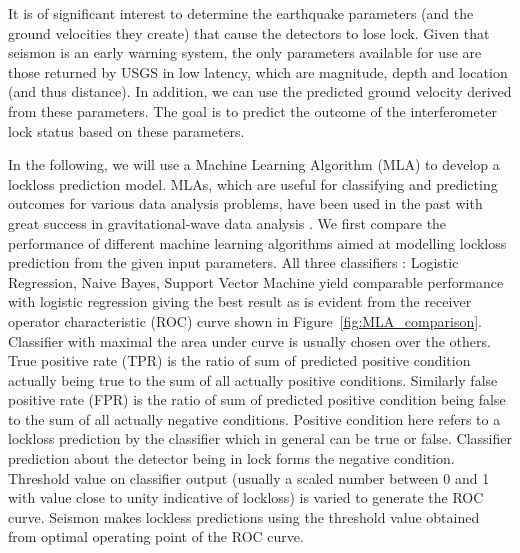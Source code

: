 \documentclass[reprint, prl, aps, showpacs]{revtex4-1}
\newcommand{\seismon}{\textnormal{seismon }}
\begin{document}

It is of significant interest to determine the earthquake parameters (and the ground velocities they create) that cause the detectors to lose lock.
Given that \seismon is an early warning system, the only parameters available for use are those returned by USGS in low latency, which are magnitude, depth and location (and thus distance). 
In addition, we can use the predicted ground velocity derived from these parameters.
The goal is to predict the outcome of the interferometer lock status based on these parameters.

In the following, we will use a Machine Learning Algorithm (MLA) to develop a lockloss prediction model. MLAs, which are useful for classifying and predicting outcomes for various data analysis problems, have been used in the past with great success in gravitational-wave data analysis \cite{BiBl2013,KyHa2015}. We first compare the performance of different machine learning algorithms aimed at modelling lockloss prediction from the given input parameters.  All three classifiers : Logistic Regression\cite{mccullagh_glm}, Naive Bayes\cite{John_NaiveBayes}, Support Vector Machine\cite{Burges_SVM} yield comparable performance with logistic regression giving the best result as is evident from the  receiver operator characteristic (ROC) curve shown in Figure~\ref{fig:MLA_comparison}. Classifier with maximal the area under curve is usually chosen over  the others. True positive rate (TPR) is the ratio of sum of predicted positive condition actually being true to the sum of all actually positive conditions. Similarly false positive rate (FPR) is the ratio of sum of predicted positive condition being false to the sum of all actually negative conditions. Positive condition here refers to a lockloss prediction by the classifier which in general can be true or false. Classifier prediction about the detector being in lock  forms the negative condition. Threshold value on classifier output (usually a scaled number between 0 and 1 with value close to unity indicative of lockloss) is varied to generate the ROC curve. Seismon makes lockless predictions using the threshold value obtained from optimal operating point of the ROC curve. 	
\end{document}
